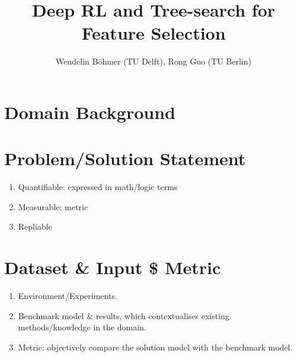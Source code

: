 

\title{Deep RL and Tree-search for Feature Selection}
\author{Wendelin B\"ohmer (TU Delft), Rong Guo (TU Berlin)}



\maketitle

\listoftodos

\section{Domain Background}


\section{Problem/Solution Statement}
\begin{enumerate}
\item
Quantifiable: expressed in math/logic terms
\item
Measurable: metric
\item
Repliable
\end{enumerate}

\section{Dataset \& Input \$ Metric}
\begin{enumerate}
\item
Environment/Experiments.
\item
Benchmark model \& results, which contextualises existing methods/knowledge in the domain.
\item
Metric: objectively compare the solution model with the benchmark model.
\end{enumerate}

